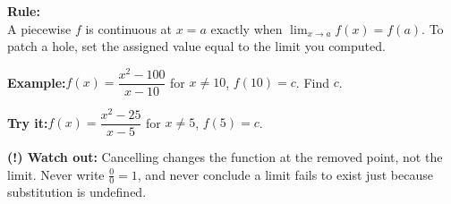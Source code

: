 \documentclass[12pt]{article}
\begin{document}
\begin{formulabox}\textbf{Rule:}\\[4pt]
A piecewise $f$ is continuous at $x=a$ exactly when
$\lim_{x\to a}f(x)=f(a)$. To patch a hole, set the assigned value equal to the
limit you computed.
\end{formulabox}
\begin{examplebox}\textbf{Example:}\quad $f(x)=\dfrac{x^2-100}{x-10}$ for $x\neq10$,
$f(10)=c$. Find $c$.
\end{examplebox}
\begin{tryitbox}\textbf{Try it:}\quad $f(x)=\dfrac{x^2-25}{x-5}$ for $x\neq5$, $f(5)=c$.\\[2pt]
\end{tryitbox}

\begin{watchoutbox}\textbf{(!) Watch out:} Cancelling changes the function at the
removed point, not the limit. Never write $\tfrac{0}{0}=1$, and never conclude a
limit fails to exist just because substitution is undefined.
\end{watchoutbox}
\end{document}
